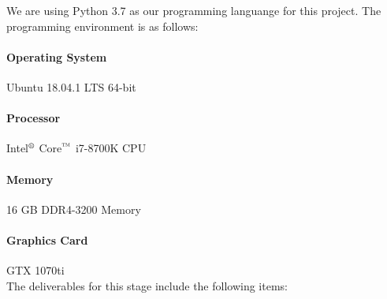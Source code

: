 
We are using Python 3.7 as our programming languange for this project. 
The programming environment is as follows:
\paragraph{Operating System}{Ubuntu 18.04.1 LTS 64-bit}
\paragraph{Processor}{Intel$ ^\text{\textregistered} $ Core$ ^{\text{\texttrademark}} $ i7-8700K CPU}
\paragraph{Memory}{16 GB DDR4-3200 Memory}
\paragraph{Graphics Card}{GTX 1070ti} \\
The deliverables for this stage include the following items:
